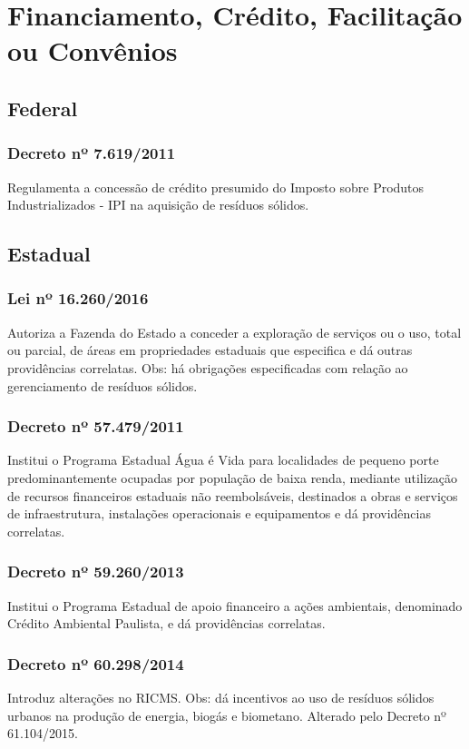 \section{Financiamento, Crédito, Facilitação ou Convênios}
\begin{subapend}
	\subsection{Federal}
	\begin{subsubapend}
		\item \subsubsection{Decreto nº 7.619/2011}
		Regulamenta a concessão de crédito presumido do Imposto sobre Produtos Industrializados - IPI na aquisição de resíduos sólidos.
	\end{subsubapend}
\end{subapend}

 \begin{subapend}
 	\subsection{Estadual}
 	\begin{subsubapend}
 		\item \subsubsection{Lei nº 16.260/2016}
 		Autoriza a Fazenda do Estado a conceder a exploração de serviços ou o uso, total ou parcial, de áreas em propriedades estaduais que especifica e dá outras providências correlatas. Obs: há obrigações especificadas com relação ao gerenciamento de resíduos sólidos.
 		\subsubsection{Decreto nº 57.479/2011}
 		Institui o Programa Estadual Água é Vida para localidades de pequeno porte predominantemente ocupadas por população de baixa renda, mediante utilização de recursos financeiros estaduais não reembolsáveis, destinados a obras e serviços de infraestrutura, instalações operacionais e equipamentos e dá providências correlatas.
 		\subsubsection{Decreto nº 59.260/2013}
 		Institui o Programa Estadual de apoio financeiro a ações ambientais, denominado Crédito Ambiental Paulista, e dá providências correlatas.
 		\subsubsection{Decreto nº 60.298/2014}
 		Introduz alterações no RICMS. Obs: dá incentivos ao uso de resíduos sólidos urbanos na produção de energia, biogás e biometano. Alterado pelo Decreto nº 61.104/2015.
 	\end{subsubapend}
 \end{subapend}
 

